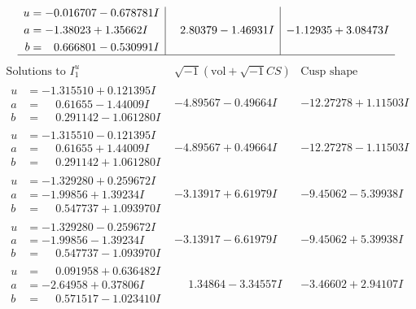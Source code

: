 \documentclass[1p]{elsarticle_modified}
\theoremstyle{definition}
\newcommand{\I}{\sqrt{-1}}
\begin{document}
$$\begin{array}{c|c|c}
\begin{aligned}
u &= -0.016707 - 0.678781 I \\
a &= -1.38023 + 1.35662 I \\
b &= \phantom{-}0.666801 - 0.530991 I\end{aligned}
 & \phantom{-}2.80379 - 1.46931 I & -1.12935 + 3.08473 I\\
 \hline 
 \end{array}$$\newpage$$\begin{array}{c|c|c}  
\text{Solutions to }I^u_{1}& \I (\text{vol} + \sqrt{-1}CS) & \text{Cusp shape}\\
 \hline 
\begin{aligned}
u &= -1.315510 + 0.121395 I \\
a &= \phantom{-}0.61655 - 1.44009 I \\
b &= \phantom{-}0.291142 - 1.061280 I\end{aligned}
 & -4.89567 - 0.49664 I & -12.27278 + 1.11503 I \\ \hline\begin{aligned}
u &= -1.315510 - 0.121395 I \\
a &= \phantom{-}0.61655 + 1.44009 I \\
b &= \phantom{-}0.291142 + 1.061280 I\end{aligned}
 & -4.89567 + 0.49664 I & -12.27278 - 1.11503 I \\ \hline\begin{aligned}
u &= -1.329280 + 0.259672 I \\
a &= -1.99856 + 1.39234 I \\
b &= \phantom{-}0.547737 + 1.093970 I\end{aligned}
 & -3.13917 + 6.61979 I & -9.45062 - 5.39938 I \\ \hline\begin{aligned}
u &= -1.329280 - 0.259672 I \\
a &= -1.99856 - 1.39234 I \\
b &= \phantom{-}0.547737 - 1.093970 I\end{aligned}
 & -3.13917 - 6.61979 I & -9.45062 + 5.39938 I \\ \hline\begin{aligned}
u &= \phantom{-}0.091958 + 0.636482 I \\
a &= -2.64958 + 0.37806 I \\
b &= \phantom{-}0.571517 - 1.023410 I\end{aligned}
 & \phantom{-}1.34864 - 3.34557 I & -3.46602 + 2.94107 I \\ \hline\begin{aligned}

\end{aligned}
\end{array}$$
\end{document}
